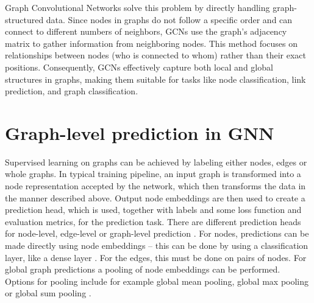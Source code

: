 Graph Convolutional Networks solve this problem by directly handling graph-structured data. Since nodes in graphs do not follow a specific order and can connect to different numbers of neighbors, GCNs use the graph's adjacency matrix to gather information from neighboring nodes. This method focuses on relationships between nodes (who is connected to whom) rather than their exact positions. Consequently, GCNs effectively capture both local and global structures in graphs, making them suitable for tasks like node classification, link prediction, and graph classification.


\section{Graph-level prediction in GNN}
Supervised learning on graphs can be achieved by labeling either nodes, edges or whole graphs. In typical training pipeline, an input graph is transformed into a node representation accepted by the network, which then transforms the data in the manner described above. Output node embeddings are then used to create a prediction head, which is used, together with labels and some loss function and evaluation metrics, for the prediction task. There are different prediction heads for node-level, edge-level or graph-level prediction \cite{Lesk2024}. For nodes, predictions can be made directly using node embeddings -- this can be done by using a classification layer, like a dense layer \cite{sanch2021}.  For the edges, this must be done on pairs of nodes. For global graph predictions a pooling of node embeddings can be performed. Options for pooling include for example global mean pooling, global max pooling or global sum pooling \cite{Lesk2024}.